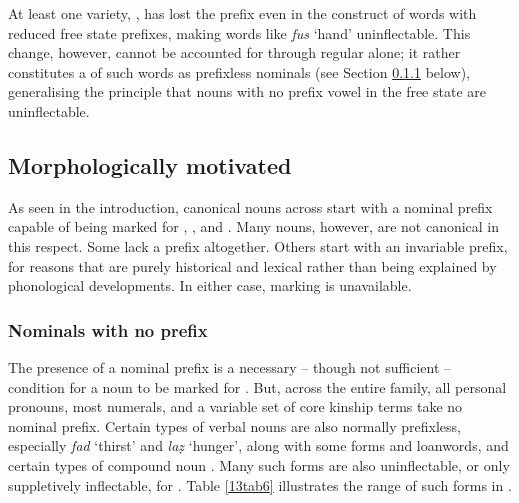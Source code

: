 \documentclass[output=paper,colorlinks,citecolor=brown]{langscibook}
\begin{document}
At least one  variety,  \citep[79]{delheureochoa2019}, has lost the prefix even in the construct  of words with reduced free state prefixes, making words like \emph{fus} `hand' uninflectable. This change, however, cannot be accounted for through regular  alone; it rather constitutes a  of such words as prefixless nominals (see Section \ref{13sec2.2.1} below), generalising the principle that nouns with no prefix vowel in the free state are uninflectable.

\subsection{Morphologically motivated} \label{13sec2.2}

As seen in the introduction, canonical nouns across  start with a nominal prefix capable of being marked for , , and . Many nouns, however, are not canonical in this respect. Some lack a prefix altogether. Others start with an invariable prefix, for reasons that are purely historical and lexical rather than being explained by phonological developments. In either case,  marking is unavailable.

\subsubsection{Nominals with no prefix} \label{13sec2.2.1}

The presence of a nominal prefix is a necessary -- though not sufficient -- condition for a noun to be marked for . But, across the entire family, all personal pronouns, most numerals, and a variable set of core kinship terms take no nominal prefix. Certain types of verbal nouns are also normally prefixless, especially \emph{fad} `thirst' and \emph{laẓ} `hunger', along with some  forms and loanwords, and certain types of compound noun \citep[58]{brugnatelli2006}. Many such forms are also uninflectable, or only suppletively inflectable, for . Table \ref{13tab6} illustrates the range of such forms in .
\end{document}

